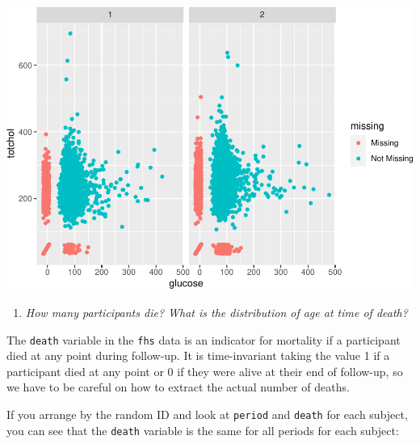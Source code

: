 \documentclass[
]{book}
\newenvironment{Shaded}{\begin{snugshade}}{\end{snugshade}}
\newcommand{\DataTypeTok}[1]{\textcolor[rgb]{0.13,0.29,0.53}{#1}}
\newcommand{\KeywordTok}[1]{\textcolor[rgb]{0.13,0.29,0.53}{\textbf{#1}}}
\newcommand{\NormalTok}[1]{#1}
\newcommand{\OperatorTok}[1]{\textcolor[rgb]{0.81,0.36,0.00}{\textbf{#1}}}
\newcommand{\StringTok}[1]{\textcolor[rgb]{0.31,0.60,0.02}{#1}}
\providecommand{\tightlist}{%
  \setlength{\itemsep}{0pt}\setlength{\parskip}{0pt}}
\begin{document}
\begin{Shaded}
\end{Shaded}

\includegraphics{adv_epi_analysis_files/figure-latex/unnamed-chunk-157-1.pdf}

\begin{enumerate}
\def\labelenumi{\arabic{enumi}.}
\setcounter{enumi}{2}
\tightlist
\item
  \emph{How many participants die? What is the distribution of age at time of death?}
\end{enumerate}

The \texttt{death} variable in the \texttt{fhs} data is an indicator for mortality if a participant died at any point during follow-up. It is time-invariant taking the value 1 if a participant died at any point or 0 if they were alive at their end of follow-up, so we have to be careful on how to extract the actual number of deaths.

If you arrange by the random ID and look at \texttt{period} and \texttt{death} for each subject,
you can see that the \texttt{death} variable is the same for all periods for each
subject:
\end{document}
